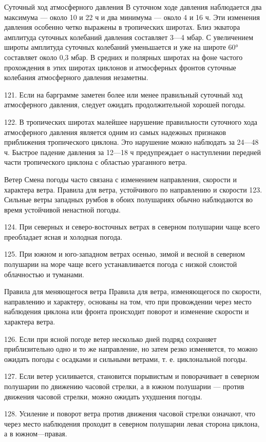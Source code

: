 Суточный ход атмосферного давления
В суточном ходе давления наблюдается два максимума — около 10 и 22 ч и два минимума — около 4 и 16 ч. Эти изменения давления особенно четко выражены в тропических широтах. Близ экватора амплитуда суточных колебаний давления составляет 3—4 мбар. С увеличением широты амплитуда суточных колебаний уменьшается и уже на широте 60° составляет около 0,3 мбар. В средних и полярных широтах на фоне частого прохождения в этих широтах циклонов и атмосферных фронтов суточные колебания атмосферного давления незаметны.

121. Если на барграмме заметен более или менее правильный суточный ход атмосферного давления, следует ожидать продолжительной хорошей погоды.

122. В тропических широтах малейшее нарушение правильности суточного хода атмосферного давления является одним из самых надежных признаков приближения тропического циклона. Это нарушение можно наблюдать за 24—48 ч. Быстрое падение давления за 12—18 ч предупреждает о наступлении передней части тропического циклона с областью ураганного ветра.

Ветер
Смена погоды часто связана с изменением направления, скорости и характера ветра.
Правила для ветра, устойчивого по направлению и скорости
123. Сильные ветры западных румбов в обоих полушариях обычно наблюдаются во время устойчивой ненастной погоды.

124. При северных и северо-восточных ветрах в северном полушарии чаще всего преобладает ясная и холодная погода.

125. При южном и юго-западном ветрах осенью, зимой и весной в северном полушарии на море чаще всего устанавливается погода с низкой слоистой облачностью и туманами.

Правила для меняющегося ветра
Правила для ветра, изменяющегося по скорости, направлению и характеру, основаны на том, что при провождении через место наблюдения циклона или фронта происходит поворот и изменение скорости и характера ветра.

126. Если при ясной погоде ветер несколько дней подряд сохраняет приблизительно одно и то же направление, но затем резко изменяется, то можно ожидать погоды с осадками и сильными ветрами, т. е. циклональной погоды.

127. Если ветер усиливается, становится порывистым и поворачивает в северном полушарии по движению часовой стрелки, а в южном полушарии — против движения часовой стрелки, можно ожидать ухудшения погоды.

128. Усиление и поворот ветра против движения часовой стрелки означают, что через место наблюдения проходит в северном полушарии левая сторона циклона, а в южном—правая.

